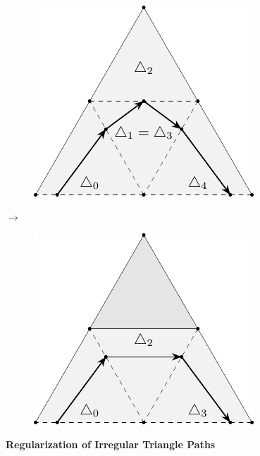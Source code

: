 \documentclass{stdlocal}
\begin{document}
  \begin{figure}
    \centering
    \begin{subfigure}[c]{0.4\linewidth}
      \centering
      \includegraphics[width=\linewidth]{figures/surface-mesh-curve-artifact.pdf}
    \end{subfigure}
    \hfill
    $\longrightarrow$
    \hfill
    \begin{subfigure}[c]{0.4\linewidth}
      \centering
      \includegraphics[width=\linewidth]{figures/surface-mesh-curve-artifact-removed.pdf}
    \end{subfigure}
    \caption[Regularization of Irregular Triangle Paths]{
      \textbf{Regularization of Irregular Triangle Paths}\\
    }
  \end{figure}
\end{document}
